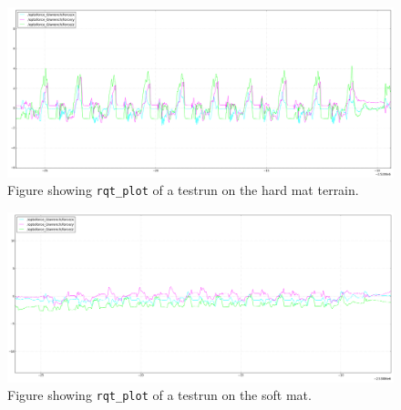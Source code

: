 \documentclass[USenglish]{ifimaster}  %
\begin{document}
\begin{figure}[h]
    \centering
    \includegraphics[width=\textwidth,height=\textheight,keepaspectratio]{Figures/mattebgraf}
    \caption{Figure showing \texttt{rqt\_plot} of a testrun on the hard mat terrain.}
\label{fig:graphhm}
\end{figure}

\begin{figure}[h]
    \centering
    \includegraphics[width=\textwidth,height=\textheight,keepaspectratio]{Figures/mykmattegraf}
    \caption{Figure showing \texttt{rqt\_plot} of a testrun on the soft mat.}
    \label{fig:graphmm}
\end{figure}
\end{document}

